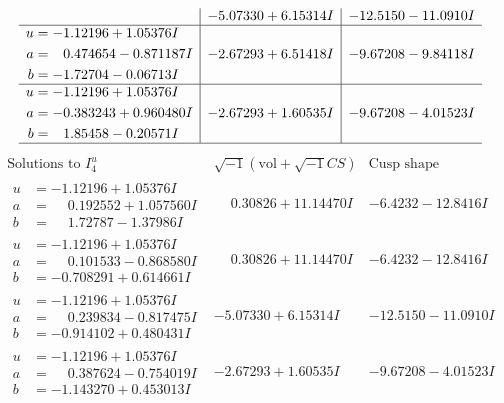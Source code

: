 \documentclass[1p]{elsarticle_modified}
\theoremstyle{definition}
\newcommand{\I}{\sqrt{-1}}
\begin{document}
$$\begin{array}{c|c|c}
 & -5.07330 + 6.15314 I & -12.5150 - 11.0910 I \\ \hline\begin{aligned}
u &= -1.12196 + 1.05376 I \\
a &= \phantom{-}0.474654 - 0.871187 I \\
b &= -1.72704 - 0.06713 I\end{aligned}
 & -2.67293 + 6.51418 I & -9.67208 - 9.84118 I \\ \hline\begin{aligned}
u &= -1.12196 + 1.05376 I \\
a &= -0.383243 + 0.960480 I \\
b &= \phantom{-}1.85458 - 0.20571 I\end{aligned}
 & -2.67293 + 1.60535 I & -9.67208 - 4.01523 I\\
 \hline 
 \end{array}$$\newpage$$\begin{array}{c|c|c}  
\text{Solutions to }I^u_{4}& \I (\text{vol} + \sqrt{-1}CS) & \text{Cusp shape}\\
 \hline 
\begin{aligned}
u &= -1.12196 + 1.05376 I \\
a &= \phantom{-}0.192552 + 1.057560 I \\
b &= \phantom{-}1.72787 - 1.37986 I\end{aligned}
 & \phantom{-}0.30826 + 11.14470 I & -6.4232 - 12.8416 I \\ \hline\begin{aligned}
u &= -1.12196 + 1.05376 I \\
a &= \phantom{-}0.101533 - 0.868580 I \\
b &= -0.708291 + 0.614661 I\end{aligned}
 & \phantom{-}0.30826 + 11.14470 I & -6.4232 - 12.8416 I \\ \hline\begin{aligned}
u &= -1.12196 + 1.05376 I \\
a &= \phantom{-}0.239834 - 0.817475 I \\
b &= -0.914102 + 0.480431 I\end{aligned}
 & -5.07330 + 6.15314 I & -12.5150 - 11.0910 I \\ \hline\begin{aligned}
u &= -1.12196 + 1.05376 I \\
a &= \phantom{-}0.387624 - 0.754019 I \\
b &= -1.143270 + 0.453013 I\end{aligned}
 & -2.67293 + 1.60535 I & -9.67208 - 4.01523 I \\ \hline\begin{aligned}

\end{aligned}
\end{array}$$
\end{document}
